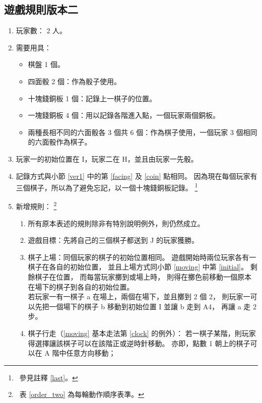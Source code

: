 \documentclass[11pt,a4paper]{article}
\begin{document}
\subsection{遊戲規則版本二} \label{ver2} %

\begin{enumerate}
	\item 玩家數： 2 人。
	\item
		需要用具：
		\begin{itemize}
			\item 棋盤 1 個。
			\item 四面骰 2 個：作為骰子使用。
			\item 十塊錢銅板 1 個：記錄上一棋子的位置。
			\item 一塊錢銅板 4 個：用以記錄各階進入點，一個玩家兩個銅板。
			\item 兩種長相不同的六面骰各 3 個共 6 個：作為棋子使用，一個玩家 3 個相同的六面骰作為棋子。
		\end{itemize}
	\item
		玩家一的初始位置在 I，玩家二在 H，並且由玩家一先骰。
	\item
		記錄方式與小節 \ref{ver1} 中的第 \ref{facing} 及 \ref{coin} 點相同。
		因為現在每個玩家有三個棋子，所以為了避免忘記，以一個十塊錢銅板記錄。
			\footnote{\ 參見註釋 \ref{last}。}
	\item
		新增規則：
			\footnote{\ 表 \ref{order_two} 為每輪動作順序表準。}
		\begin{enumerate}
			\item
				所有原本表述的規則除非有特別說明例外，則仍然成立。
			\item 
				\textsf{遊戲目標}：先將自己的三個棋子都送到 J 的玩家獲勝。
			\item
				\textsf{棋子上場}：同個玩家的棋子的初始位置相同。
				遊戲開始時兩位玩家各有一棋子在各自的初始位置，
				並且上場方式同小節 \ref{moving} 中第 \ref{initial}。
				剩餘棋子在位置，
				而每當玩家擲到或場上時，
				則得在擲色前移動一個原本在場下的棋子到各自的初始位置。\\
				\zB 若玩家一有一棋子 a 在場上，兩個在場下，並且擲到 2 個 2，
				則玩家一可以先把一個場下的棋子 b 移動到初始位置 I 並讓 b 走到 A4，
				再讓 a 走 2 步。
			\item
				\textsf{棋子行走}（\ref{moving} 基本走法第 \ref{clock} 的例外）：
				若一棋子某階，則玩家得選擇讓該棋子可以在該階正或逆時針移動。
				亦即，點數 1 朝上的棋子可以在 A 階中任意方向移動；

\end{enumerate}
\end{enumerate}
\end{document}

